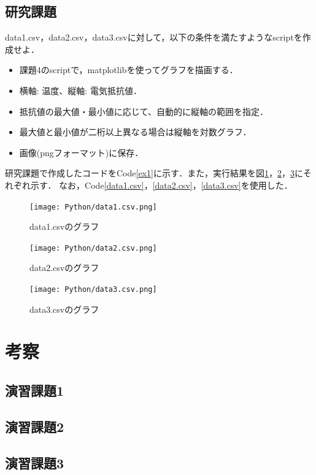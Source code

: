 \documentclass[a4paper,11pt]{jsarticle}
\begin{document}
\subsection{研究課題}
  \begin{screen}
    data1.csv，data2.csv，data3.csvに対して，以下の条件を満たすようなscriptを作成せよ．
    \begin{itemize}
      \item 課題4のscriptで，matplotlibを使ってグラフを描画する．
      \item 横軸: 温度、縦軸: 電気抵抗値．
      \item 抵抗値の最大値・最小値に応じて、自動的に縦軸の範囲を指定．
      \item 最大値と最小値が二桁以上異なる場合は縦軸を対数グラフ．
      \item 画像(pngフォーマット)に保存．
    \end{itemize}
  \end{screen}
  研究課題で作成したコードをCode\ref{ex1}に示す．また，実行結果を図\ref{ex1p}，\ref{ex2p}，\ref{ex3p}にそれぞれ示す．
  なお，Code\ref{data1.csv}，\ref{data2.csv}，\ref{data3.csv}を使用した．
  
  \begin{figure}[H]
    \centering
    \texttt{[image: Python/data1.csv.png]}
    \caption{data1.csvのグラフ}
    \label{ex1p}
  \end{figure}
  \begin{figure}[H]
    \centering
    \texttt{[image: Python/data2.csv.png]}
    \caption{data2.csvのグラフ}
    \label{ex2p}
  \end{figure}
  \begin{figure}[H]
    \centering
    \texttt{[image: Python/data3.csv.png]}
    \caption{data3.csvのグラフ}
    \label{ex3p}
  \end{figure}

\section{考察}
\subsection{演習課題1}
  

\subsection{演習課題2}
  

\subsection{演習課題3}
\end{document}
